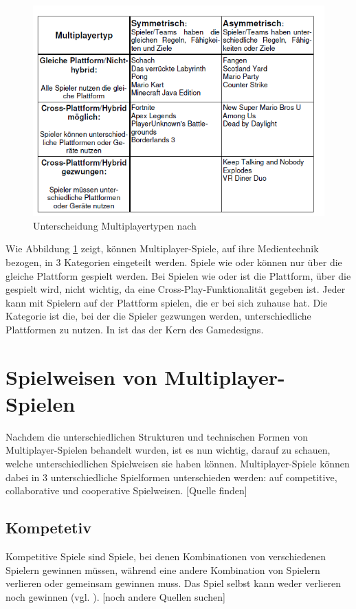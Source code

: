 \begin{figure}[ht]
\centering
\includegraphics[width=1\linewidth]{content/pictures/lotz_hybrid_multiplayer.PNG}
\caption{Unterscheidung Multiplayertypen nach \cite[S.6]{lotz_konzeption_2021}}
\label{fig:lotz_multiplayer_types}
\end{figure}

Wie Abbildung \ref{fig:lotz_multiplayer_types} zeigt, können Multiplayer-Spiele, auf ihre Medientechnik bezogen, in 3 Kategorien eingeteilt werden.
Spiele wie  oder  können nur über die gleiche Plattform gespielt werden. Bei Spielen wie  oder  ist die Plattform, über die gespielt wird, nicht wichtig, da eine Cross-Play-Funktionalität gegeben ist. Jeder kann mit Spielern auf der Plattform spielen, die er bei sich zuhause hat. Die Kategorie ist die, bei der die Spieler gezwungen werden, unterschiedliche Plattformen zu nutzen. In  ist das der Kern des Gamedesigns.

\section{Spielweisen von Multiplayer-Spielen}
Nachdem die unterschiedlichen Strukturen und technischen Formen von Multiplayer-Spielen behandelt wurden, ist es nun wichtig, darauf zu schauen, welche unterschiedlichen Spielweisen sie haben können. Multiplayer-Spiele können dabei in 3 unterschiedliche Spielformen unterschieden werden:
auf competitive, collaborative und cooperative Spielweisen. [Quelle finden]

\subsection{Kompetetiv}
Kompetitive Spiele sind Spiele, bei denen Kombinationen von verschiedenen Spielern gewinnen müssen, während eine andere Kombination von Spielern verlieren oder gemeinsam gewinnen muss. Das Spiel selbst kann weder verlieren noch gewinnen (vgl. \cite{noauthor_game_2014}). [noch andere Quellen suchen]


